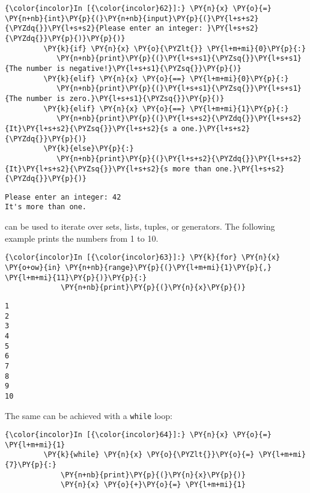 \begin{Verbatim}[commandchars=\\\{\}]
{\color{incolor}In [{\color{incolor}62}]:} \PY{n}{x} \PY{o}{=} \PY{n+nb}{int}\PY{p}{(}\PY{n+nb}{input}\PY{p}{(}\PY{l+s+s2}{\PYZdq{}}\PY{l+s+s2}{Please enter an integer: }\PY{l+s+s2}{\PYZdq{}}\PY{p}{)}\PY{p}{)}
         \PY{k}{if} \PY{n}{x} \PY{o}{\PYZlt{}} \PY{l+m+mi}{0}\PY{p}{:}
            \PY{n+nb}{print}\PY{p}{(}\PY{l+s+s1}{\PYZsq{}}\PY{l+s+s1}{The number is negative!}\PY{l+s+s1}{\PYZsq{}}\PY{p}{)}
         \PY{k}{elif} \PY{n}{x} \PY{o}{==} \PY{l+m+mi}{0}\PY{p}{:}
            \PY{n+nb}{print}\PY{p}{(}\PY{l+s+s1}{\PYZsq{}}\PY{l+s+s1}{The number is zero.}\PY{l+s+s1}{\PYZsq{}}\PY{p}{)}
         \PY{k}{elif} \PY{n}{x} \PY{o}{==} \PY{l+m+mi}{1}\PY{p}{:}
            \PY{n+nb}{print}\PY{p}{(}\PY{l+s+s2}{\PYZdq{}}\PY{l+s+s2}{It}\PY{l+s+s2}{\PYZsq{}}\PY{l+s+s2}{s a one.}\PY{l+s+s2}{\PYZdq{}}\PY{p}{)}
         \PY{k}{else}\PY{p}{:}
            \PY{n+nb}{print}\PY{p}{(}\PY{l+s+s2}{\PYZdq{}}\PY{l+s+s2}{It}\PY{l+s+s2}{\PYZsq{}}\PY{l+s+s2}{s more than one.}\PY{l+s+s2}{\PYZdq{}}\PY{p}{)}
\end{Verbatim}

\begin{Verbatim}[commandchars=\\\{\}]
Please enter an integer: 42
It's more than one.
\end{Verbatim}
 can be used to iterate over sets, lists, tuples, or
generators. The following example prints the numbers from 1 to 10.
 

\begin{Verbatim}[commandchars=\\\{\}]
{\color{incolor}In [{\color{incolor}63}]:} \PY{k}{for} \PY{n}{x} \PY{o+ow}{in} \PY{n+nb}{range}\PY{p}{(}\PY{l+m+mi}{1}\PY{p}{,} \PY{l+m+mi}{11}\PY{p}{)}\PY{p}{:}
             \PY{n+nb}{print}\PY{p}{(}\PY{n}{x}\PY{p}{)}
\end{Verbatim}


\begin{Verbatim}[commandchars=\\\{\}]
1
2
3
4
5
6
7
8
9
10
\end{Verbatim}
The same can be achieved with a \texttt{while} loop:

\begin{Verbatim}[commandchars=\\\{\}]
{\color{incolor}In [{\color{incolor}64}]:} \PY{n}{x} \PY{o}{=} \PY{l+m+mi}{1}
         \PY{k}{while} \PY{n}{x} \PY{o}{\PYZlt{}}\PY{o}{=} \PY{l+m+mi}{7}\PY{p}{:}
             \PY{n+nb}{print}\PY{p}{(}\PY{n}{x}\PY{p}{)}
             \PY{n}{x} \PY{o}{+}\PY{o}{=} \PY{l+m+mi}{1}
\end{Verbatim}


